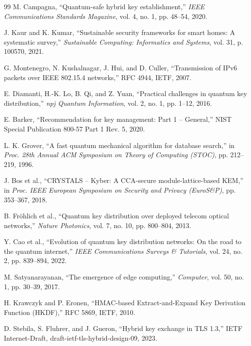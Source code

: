 \documentclass[journal]{IEEEtran}
\begin{document}
\begin{thebibliography}{99}
M. Campagna,
``Quantum-safe hybrid key establishment,''
\emph{IEEE Communications Standards Magazine}, vol. 4, no. 1, pp. 48--54, 2020.

J. Kaur and K. Kumar,
``Sustainable security frameworks for smart homes: A systematic survey,''
\emph{Sustainable Computing: Informatics and Systems}, vol. 31, p. 100570, 2021.

G. Montenegro, N. Kushalnagar, J. Hui, and D. Culler,
``Transmission of IPv6 packets over IEEE 802.15.4 networks,''
RFC 4944, IETF, 2007.

E. Diamanti, H.-K. Lo, B. Qi, and Z. Yuan,
``Practical challenges in quantum key distribution,''
\emph{npj Quantum Information}, vol. 2, no. 1, pp. 1--12, 2016.

E. Barker,
``Recommendation for key management: Part 1 -- General,''
NIST Special Publication 800-57 Part 1 Rev. 5, 2020.

L. K. Grover,
``A fast quantum mechanical algorithm for database search,''
in \emph{Proc. 28th Annual ACM Symposium on Theory of Computing (STOC)}, pp. 212--219, 1996.

J. Bos et al.,
``CRYSTALS -- Kyber: A CCA-secure module-lattice-based KEM,''
in \emph{Proc. IEEE European Symposium on Security and Privacy (EuroS\&P)}, pp. 353--367, 2018.

B. Fr{\"o}hlich et al.,
``Quantum key distribution over deployed telecom optical networks,''
\emph{Nature Photonics}, vol. 7, no. 10, pp. 800--804, 2013.

Y. Cao et al.,
``Evolution of quantum key distribution networks: On the road to the quantum internet,''
\emph{IEEE Communications Surveys \& Tutorials}, vol. 24, no. 2, pp. 839--894, 2022.

M. Satyanarayanan,
``The emergence of edge computing,''
\emph{Computer}, vol. 50, no. 1, pp. 30--39, 2017.

H. Krawczyk and P. Eronen,
``HMAC-based Extract-and-Expand Key Derivation Function (HKDF),''
RFC 5869, IETF, 2010.

D. Stebila, S. Fluhrer, and J. Gueron,
``Hybrid key exchange in TLS 1.3,''
IETF Internet-Draft, draft-ietf-tls-hybrid-design-09, 2023.


\end{thebibliography}
\end{document}
